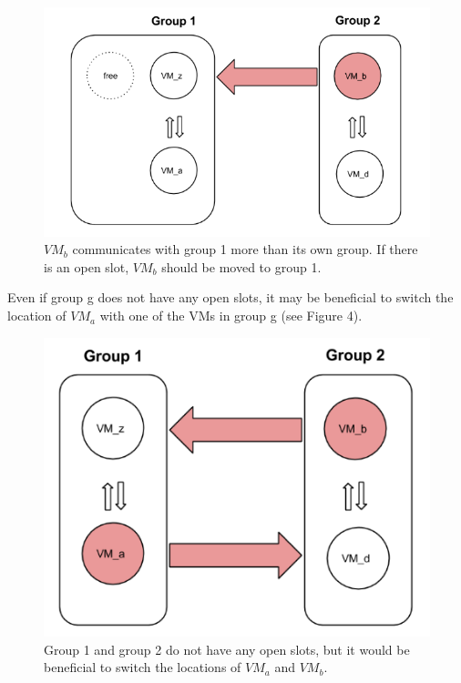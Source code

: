 \documentclass[11pt]{article}
\begin{document}
\begin{figure}
  \centering
\includegraphics[scale=0.65]{micro1.png}

 \caption{$VM_b$ communicates with group 1 more than its own group.  If there is an open slot, $VM_b$ should be moved to group 1.}
 
\end{figure}

Even if group g does not have any open slots, it may be beneficial to switch the location of $VM_a$ with one of the VMs in group g (see Figure 4).
\begin{figure}
  \centering
\includegraphics[scale=0.65]{micro2.png}

 \caption{Group 1 and group 2 do not have any open slots, but it would be beneficial to switch the locations of $VM_a$ and $VM_b$.}
 
\end{figure}
\end{document}
